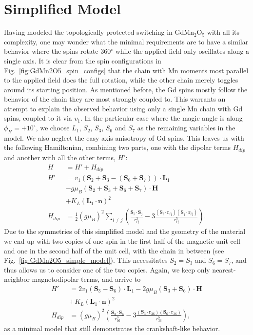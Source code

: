\section{Simplified Model}
Having modeled the topologically protected switching in  GdMn$_2$O$_5$ with all its complexity, one may wonder what the minimal requirements are to have a similar behavior where the spins rotate 360$^\circ$ while the applied field only oscillates along a single axis.
It is clear from the spin configurations in Fig.~\ref{fig:GdMn2O5_spin_configs} that the chain with Mn moments most parallel to the applied field does the full rotation, while the other chain merely toggles around its starting position. As mentioned before, the Gd spins mostly follow the behavior of the chain they are most strongly coupled to. This warrants an attempt to explain the observed behavior using only a single Mn chain with Gd spins, coupled to it via $v_1$. 
In the particular case where the magic angle is along $\phi_H = +10^\circ$, we choose $L_1$, $S_2$, $S_3$, $
S_6$ and $S_7$ as the remaining variables in the model. We also neglect the easy axis anisotropy of Gd spins.
This leaves us with the following Hamiltonian, combining two parts, one with the dipolar terms $H_{dip}$ and another with all the other terms, $H'$:
\begin{align}
	H &= H' + H_{dip} \\
	H' &= v_1(\bm{S}_2 + \bm{S}_3 - (\bm{S}_6 + \bm{S}_7))\cdot\bm{L}_1 \nonumber\\
	&- g \mu_B (\bm{S}_2 + \bm{S}_3 + \bm{S}_6 + \bm{S}_7) \cdot \bm{H} \nonumber\\
	&+ K_L (\bm{L}_1 \cdot \bm{n})^2 \nonumber\\
	H_{dip} &= \frac{1}{2}(g \mu_B)^2\sum_{i\neq j}\left(\frac{\bm{S}_i\cdot \bm{S}_j}{r_{ij}^
3}-3\frac{(\bm{S}_i\cdot \bm{r}_{ij})(\bm{S}_j\cdot \bm{r}_{ij})}{r_{ij}^5}\right)\nonumber.
\end{align}
Due to the symmetries of this simplified model and the geometry of the material we end up with two copies of one spin in the first half of the magnetic unit cell and one in the second half of the unit cell, with the chain in between (see Fig.~\ref{fig:GdMn2O5_simple_model}).
This necessitates $S_2 = S_3$ and $S_6 = S_7$, and thus allows us to consider one of the two copies. Again, we keep only nearest-neighbor magnetodipolar terms, and arrive to
\begin{align}
	H' &= 2v_1(\bm{S}_3 - \bm{S}_6)\cdot\bm{L}_1 - 2g \mu_B (\bm{S}_3 + \bm{S}_6) 
\cdot \bm{H} \\
	&+ K_L (\bm{L}_1 \cdot \bm{n})^2 \nonumber\\
	H_{dip} &= (g \mu_B)^2\left(\frac{\bm{S}_3\cdot \bm{S}_6}{r_{36}^3}-3\frac{(\bm{S}_3\cdot \bm{r}_{36})(\bm{S}_6\cdot \bm{r}_{36})}{r_{36}^5}\right)\nonumber,
\end{align}
as a minimal model that still demonstrates the crankshaft-like behavior.

